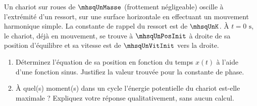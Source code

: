 
Un chariot sur roues de $\mhsqUnMasse$ (frottement négligeable) oscille à l’extrémité d’un ressort, sur une surface horizontale en effectuant un mouvement harmonique simple. La constante de rappel du ressort est de $\mhsqUnK$. À $t = 0\text{ s}$, le chariot, déjà en mouvement, se trouve à $\mhsqUnPosInit$ à droite de sa position d’équilibre et sa vitesse est de $\mhsqUnVitInit$ vers la droite.

\begin{enumerate}[label=\alph*)]
    \item Déterminez l’équation de sa position en fonction du temps $x(t)$ à l’aide d’une fonction sinus. Justifiez la valeur trouvée pour la constante de phase.
    \item À quel(s) moment(s) dans un cycle l’énergie potentielle du chariot est-elle maximale ? Expliquez votre réponse qualitativement, sans aucun calcul.
\end{enumerate}